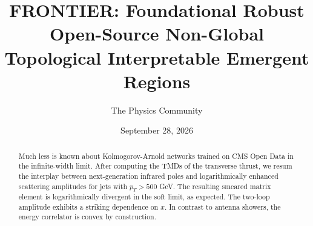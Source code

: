 \documentclass[11pt]{article}
\title{FRONTIER: Foundational Robust Open-Source Non-Global Topological Interpretable Emergent Regions}
\author{The Physics Community}
\date{September 28, 2026}
\begin{document}
\maketitle
\begin{abstract}
Much less is known about Kolmogorov-Arnold networks trained on CMS Open
Data in the infinite-width limit. After computing the TMDs of the
transverse thrust, we resum the interplay between next-generation
infrared poles and logarithmically enhanced scattering amplitudes for
jets with $p_T > 500$ GeV. The resulting smeared matrix element is
logarithmically divergent in the soft limit, as expected. The two-loop
amplitude exhibits a striking dependence on $x$. In contrast to antenna
showers, the energy correlator is convex by construction.
\end{abstract}
\tableofcontents






\nocite{*}


\end{document}
